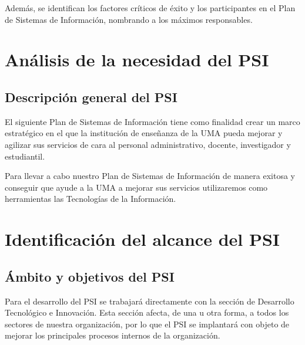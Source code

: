 \documentclass[12pt,a4paper,spanish,twoside]{book}
\begin{document}
Además, se identifican los factores críticos de éxito y los participantes en
el Plan de Sistemas de Información, nombrando a los máximos responsables.

\section{Análisis de la necesidad del PSI}
\subsection{Descripción general del PSI}
El siguiente Plan de Sistemas de Información tiene como finalidad crear un 
marco estratégico en el que la institución de enseñanza de la UMA pueda
mejorar y agilizar sus servicios de cara al personal administrativo, docente, 
investigador y estudiantil.

Para llevar a cabo nuestro Plan de Sistemas de Información de manera exitosa 
y conseguir que ayude a la UMA a mejorar sus servicios utilizaremos como 
herramientas las Tecnologías de la Información.

\section{Identificación del alcance del PSI}
\subsection{Ámbito y objetivos del PSI}
Para el desarrollo del PSI se trabajará directamente con la sección de 
Desarrollo Tecnológico e Innovación. Esta sección afecta, de una u otra
forma, a todos los sectores de nuestra organización, por lo que el PSI se
implantará con objeto de mejorar los principales procesos internos de la
organización.
\end{document}
